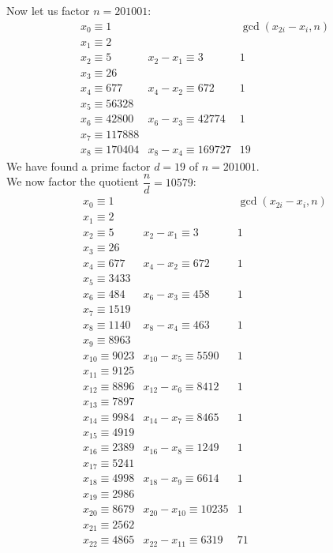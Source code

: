 \documentclass[11pt]{article}
\begin{document}
Now let us factor $n = 201001$:
\[
  \begin{array}{llc}
    x_0 \equiv 1         &                       & \gcd(x_{2i} - x_i, n)\\
    x_1 \equiv 2\\
    x_2 \equiv 5         & x_2 - x_1 \equiv 3    &                  1\\
    x_3 \equiv 26\\
    x_4 \equiv 677       & x_4 - x_2 \equiv 672  &                  1\\
    x_5 \equiv 56328\\
    x_6 \equiv 42800     & x_6 - x_3 \equiv 42774&                  1\\
    x_7 \equiv 117888\\
    x_8 \equiv 170404    & x_8 - x_4 \equiv 169727&                19
  \end{array}
\]
We have found a prime factor $d = 19$ of $n = 201001$.\\
We now factor the quotient $\dfrac{n}{d} = 10579$:
\[
  \begin{array}{llc}
    x_0   \equiv 1    &                            & \gcd(x_{2i} - x_i, n)\\
    x_1   \equiv 2\\
    x_2   \equiv 5    & x_2    - x_1   \equiv 3    &                  1\\
    x_3   \equiv 26\\
    x_4   \equiv 677  & x_4    - x_2   \equiv 672  &                  1\\
    x_5   \equiv 3433 \\
    x_6   \equiv 484  & x_6    - x_3   \equiv 458  &                  1\\
    x_7   \equiv 1519 \\
    x_8   \equiv 1140 & x_8    - x_4   \equiv 463  &                  1\\
    x_9   \equiv 8963 \\
    x_{10}\equiv 9023 & x_{10} - x_5   \equiv 5590 &                  1\\
    x_{11}\equiv 9125 \\
    x_{12}\equiv 8896 & x_{12} - x_6   \equiv 8412 &                  1\\
    x_{13}\equiv 7897 \\
    x_{14}\equiv 9984 & x_{14} - x_7   \equiv 8465 &                  1\\
    x_{15}\equiv 4919 \\
    x_{16}\equiv 2389 & x_{16} - x_8   \equiv 1249 &                  1\\
    x_{17}\equiv 5241 \\
    x_{18}\equiv 4998 & x_{18} - x_9   \equiv 6614 &                  1\\
    x_{19}\equiv 2986 \\
    x_{20}\equiv 8679 & x_{20} - x_{10}\equiv 10235&                  1\\
    x_{21}\equiv 2562 \\
    x_{22}\equiv 4865 & x_{22} - x_{11}\equiv 6319 &                 71
  \end{array}
\]
\end{document}
